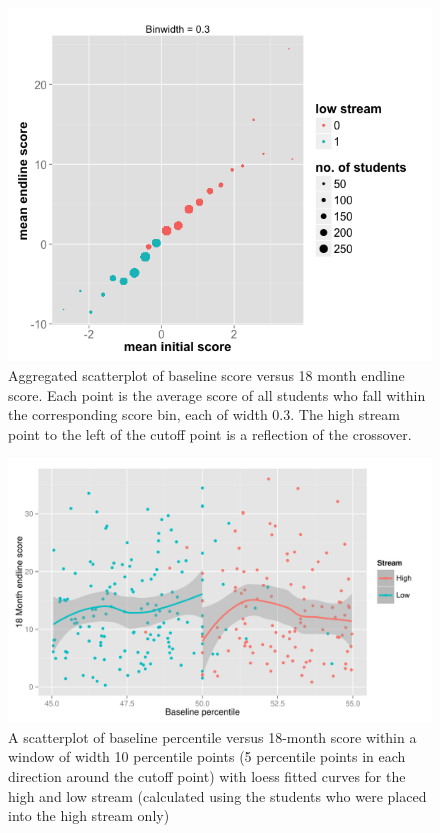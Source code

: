 \documentclass[11pt]{article}
\begin{document}
  \begin{figure}[H]
 \centering
 \includegraphics[scale=0.6]{RD_initial.png}
 \caption{Aggregated scatterplot of baseline score versus 18 month endline score. Each point is the average score of all students who fall within the corresponding score bin, each of width 0.3. The high stream point to the left of the cutoff point is a reflection of the crossover.}
 \label{fig:RD_big}
 \end{figure}

  \begin{figure}[H]
 \centering
 \includegraphics[scale=0.6]{RD_scatter.pdf}
 \caption{A scatterplot of baseline percentile versus 18-month score within a window of width 10 percentile points (5 percentile points in each direction around the cutoff point) with loess fitted curves for the high and low stream (calculated using the students who were placed into the high stream only)}
 \label{fig:RD_scatter}
 \end{figure}
\end{document}
